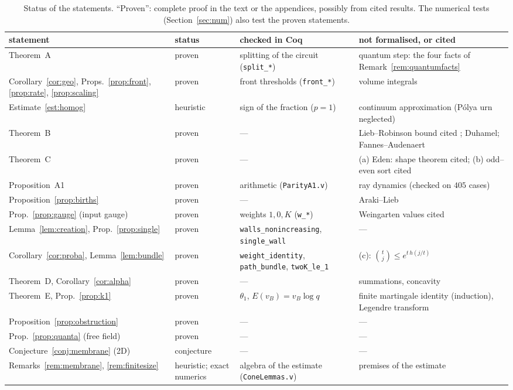 \begin{table}[h]
\centering\footnotesize\setlength{\tabcolsep}{3.5pt}
\begin{tabular}{p{3.6cm}p{2.4cm}p{4.3cm}p{4.7cm}}
\toprule
statement & status & checked in Coq & not formalised, or cited\\
\midrule
Theorem~A & proven & splitting of the circuit (\texttt{split\_*}) & quantum step: the four facts of Remark~\ref{rem:quantumfacts}\\
Corollary~\ref{cor:geo}, Props.~\ref{prop:front}, \ref{prop:rate}, \ref{prop:scaling} & proven & front thresholds (\texttt{front\_*}) & volume integrals\\
Estimate~\ref{est:homog} & heuristic & sign of the fraction ($p=1$) & continuum approximation (P\'olya urn neglected)\\
Theorem~B & proven & --- & Lieb--Robinson bound cited \cite{NSY2019}; Duhamel; Fannes--Audenaert\\
Theorem~C & proven & --- & (a) Eden: shape theorem cited; (b) odd--even sort cited\\
Proposition~A1 & proven & arithmetic (\texttt{ParityA1.v}) & ray dynamics (checked on $405$ cases)\\
Proposition~\ref{prop:births} & proven & --- & Araki--Lieb\\
Prop.~\ref{prop:gauge} (input gauge) & proven & weights $1,0,K$ (\texttt{w\_*}) & Weingarten values cited \cite{CollinsSniady2006}\\
Lemma~\ref{lem:creation}, Prop.~\ref{prop:single} & proven & \texttt{walls\_nonincreasing}, \texttt{single\_wall} & ---\\
Corollary~\ref{cor:proba}, Lemma~\ref{lem:bundle} & proven & \texttt{weight\_identity}, \texttt{path\_bundle}, \texttt{twoK\_le\_1} & (c): $\binom tj\le e^{t\,h(j/t)}$\\
Theorem~D, Corollary~\ref{cor:alpha} & proven & --- & summations, concavity\\
Theorem~E, Prop.~\ref{prop:k1} & proven & $\theta_1$, $E(v_B)=v_B\log q$ & finite martingale identity (induction), Legendre transform\\
Proposition~\ref{prop:obstruction} & proven & --- & ---\\
Prop.~\ref{prop:quanta} (free field) & proven & --- & ---\\
Conjecture~\ref{conj:membrane} (2D) & conjecture & --- & ---\\
Remarks~\ref{rem:membrane}, \ref{rem:finitesize} & heuristic; exact numerics & algebra of the estimate (\texttt{ConeLemmas.v}) & premises of the estimate\\
\bottomrule
\end{tabular}
\caption{Status of the statements. ``Proven'': complete proof in the text or the appendices, possibly from cited results. The numerical tests (Section~\ref{sec:num}) also test the proven statements.}
\label{tab:status}
\end{table}

